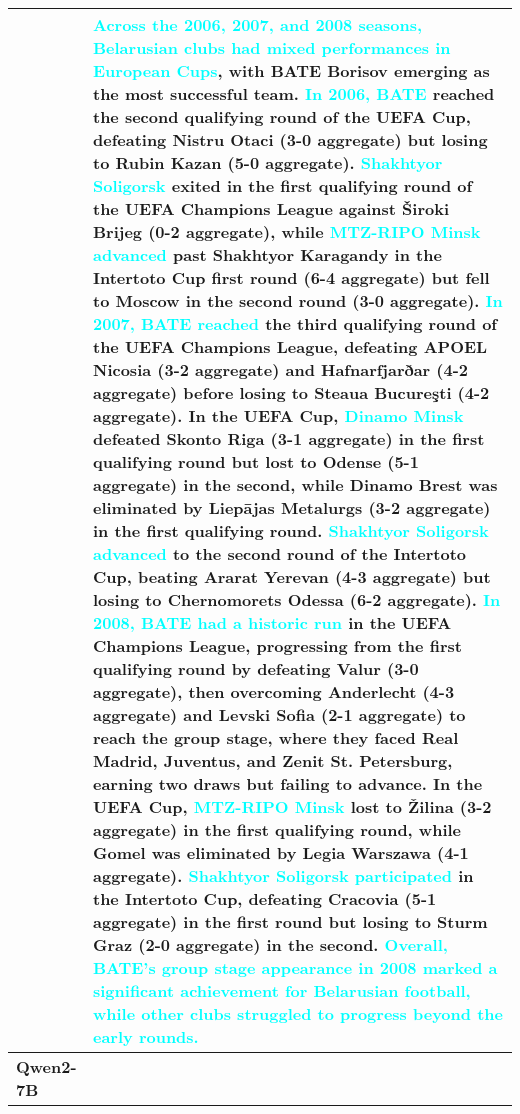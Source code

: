 \begin{table*}[htbp]
\begin{small}
\begin{tabularx}{\textwidth}{%
>{\arraybackslash}p{}
>{\arraybackslash}X
}
& \textcolor{cyan}{Across the 2006, 2007, and 2008 seasons, Belarusian clubs had mixed performances in European Cups}, with BATE Borisov emerging as the most successful team. \textcolor{cyan}{In 2006, BATE} reached the second qualifying round of the UEFA Cup, defeating Nistru Otaci (3-0 aggregate) but losing to Rubin Kazan (5-0 aggregate). \textcolor{cyan}{Shakhtyor Soligorsk} exited in the first qualifying round of the UEFA Champions League against Široki Brijeg (0-2 aggregate), while \textcolor{cyan}{MTZ-RIPO Minsk advanced} past Shakhtyor Karagandy in the Intertoto Cup first round (6-4 aggregate) but fell to Moscow in the second round (3-0 aggregate). \textcolor{cyan}{In 2007, BATE reached} the third qualifying round of the UEFA Champions League, defeating APOEL Nicosia (3-2 aggregate) and Hafnarfjarðar (4-2 aggregate) before losing to Steaua Bucureşti (4-2 aggregate). In the UEFA Cup, \textcolor{cyan}{Dinamo Minsk} defeated Skonto Riga (3-1 aggregate) in the first qualifying round but lost to Odense (5-1 aggregate) in the second, while Dinamo Brest was eliminated by Liepājas Metalurgs (3-2 aggregate) in the first qualifying round. \textcolor{cyan}{Shakhtyor Soligorsk advanced} to the second round of the Intertoto Cup, beating Ararat Yerevan (4-3 aggregate) but losing to Chernomorets Odessa (6-2 aggregate). \textcolor{cyan}{In 2008, BATE had a historic run} in the UEFA Champions League, progressing from the first qualifying round by defeating Valur (3-0 aggregate), then overcoming Anderlecht (4-3 aggregate) and Levski Sofia (2-1 aggregate) to reach the group stage, where they faced Real Madrid, Juventus, and Zenit St. Petersburg, earning two draws but failing to advance. In the UEFA Cup, \textcolor{cyan}{MTZ-RIPO Minsk} lost to Žilina (3-2 aggregate) in the first qualifying round, while Gomel was eliminated by Legia Warszawa (4-1 aggregate). \textcolor{cyan}{Shakhtyor Soligorsk participated} in the Intertoto Cup, defeating Cracovia (5-1 aggregate) in the first round but losing to Sturm Graz (2-0 aggregate) in the second. \textcolor{cyan}{Overall, BATE's group stage appearance in 2008 marked a significant achievement for Belarusian football, while other clubs struggled to progress beyond the early rounds.} \\ \midrule
\textbf{Qwen2-7B}

\end{tabularx}
\end{small}
\end{table*}
